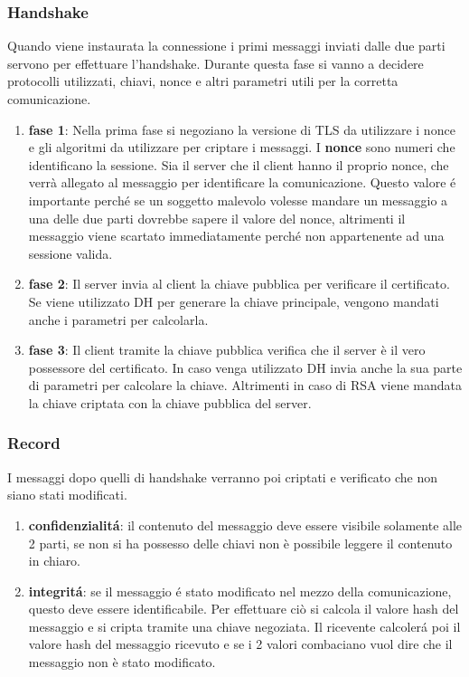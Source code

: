 \subsubsection{Handshake}\label{arte:handshake}
Quando viene instaurata la connessione i primi messaggi inviati dalle due parti servono per effettuare l'handshake. Durante questa fase si vanno a decidere protocolli utilizzati, chiavi, nonce e altri parametri utili per la corretta comunicazione.
\begin{enumerate}
  \item \textbf{fase 1}: Nella prima fase si negoziano la versione di TLS da utilizzare i nonce e gli algoritmi da utilizzare per criptare i messaggi. I \textbf{nonce} sono numeri che identificano la sessione. Sia il server che il client hanno il proprio nonce, che verrà allegato al messaggio per identificare la comunicazione. Questo valore é importante perché se un soggetto malevolo volesse mandare un messaggio a una delle due parti dovrebbe sapere il valore del nonce, altrimenti il messaggio viene scartato immediatamente perché non appartenente ad una sessione valida.
  \item \textbf{fase 2}: Il server invia al client la chiave pubblica per verificare il certificato. Se viene utilizzato DH per generare la chiave principale, vengono mandati anche i parametri per calcolarla.
  \item \textbf{fase 3}: Il client tramite la chiave pubblica verifica che il server è il vero possessore del certificato. In caso venga utilizzato DH invia anche la sua parte di parametri per calcolare la chiave. Altrimenti in caso di RSA viene mandata la chiave criptata con la chiave pubblica del server.
\end{enumerate}
\subsubsection{Record}
I messaggi dopo quelli di handshake verranno poi criptati e verificato che non siano stati modificati.
\begin{enumerate}
\item \textbf{confidenzialitá}: il contenuto del messaggio deve essere visibile solamente alle 2 parti, se non si ha possesso delle chiavi non è possibile leggere il contenuto in chiaro.
\item \textbf{integritá}: se il messaggio é stato modificato nel mezzo della comunicazione, questo deve essere identificabile. Per effettuare ciò si calcola il valore hash del messaggio e si cripta tramite una chiave negoziata. Il ricevente calcolerá poi il valore hash del messaggio ricevuto e se i 2 valori combaciano vuol dire che il messaggio non è stato modificato.
\end{enumerate}

